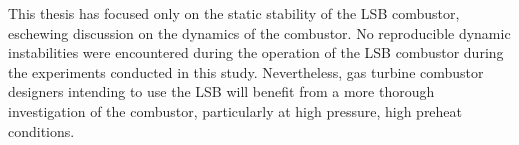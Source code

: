 This thesis has focused only on the static stability of the LSB combustor, eschewing discussion on the dynamics of the combustor.
No reproducible dynamic instabilities were encountered during the operation of the LSB combustor during the experiments conducted in this study.
Nevertheless, gas turbine combustor designers intending to use the LSB will benefit from a more thorough investigation of the combustor, particularly at high pressure, high preheat conditions.

